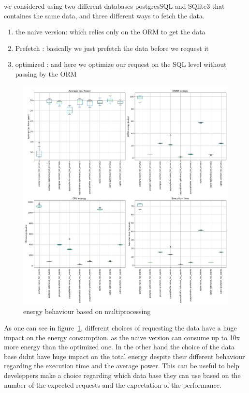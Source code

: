 we considered using two different databases postgresSQL and SQlite3 that containes the same data, and three different ways to fetch the data.
\begin{enumerate}
    \item the naive version: which relies only on the ORM to get the data
    \item Prefetch : basically we just prefetch the data before we request it
    \item optimized : and here we optimize our request on the SQL level without passing by the ORM
\end{enumerate}

\begin{figure}[!hbt]
    \centering
    \includegraphics[width=\linewidth]{imgs/django}
    \caption{energy behaviour based on multiprocessing}
    \label{fig:django}
\end{figure}



As one can see in figure~\ref{fig:django}, different choices of requesting the data have a huge impact on the energy consumption. as the naive version can consume up to 10x more energy than the optimized one.
In the other hand the choice of the data base didnt have huge impact on the total energy despite their different behaviour regarding the execution time and the average power.
This can be useful to help develeppers make a choice regarding which data base they can use based on the number of the expected requests and the expectation of the performance.

